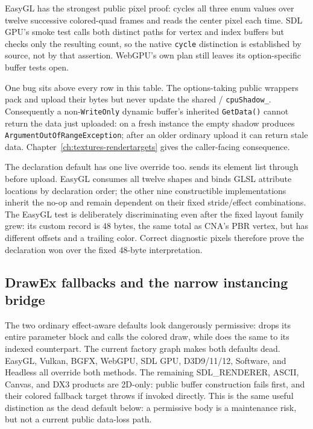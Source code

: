 EasyGL has the strongest public pixel proof:
 cycles all three enum values over twelve
successive colored-quad frames and reads the center pixel each time. SDL GPU's smoke test
calls both distinct paths for vertex and index buffers but checks only the resulting count,
so the native \texttt{cycle} distinction is established by source, not by that assertion.
WebGPU's own plan still leaves its option-specific buffer tests open.

One bug sits above every row in this table. The options-taking public wrappers pack and upload
their bytes but never update the shared /
\texttt{cpuShadow\_}. Consequently a non-\texttt{WriteOnly} dynamic buffer's inherited
\texttt{GetData()} cannot return the data just uploaded: on a fresh instance the empty shadow
produces \texttt{ArgumentOutOfRangeException}; after an older ordinary upload it can return
stale data. Chapter~\ref{ch:textures-rendertargets} gives the caller-facing consequence.

The declaration default has one live override too.  sends
its element list through  before upload. EasyGL consumes all
twelve  shapes and binds GLSL attribute locations by declaration
order; the other nine constructible implementations inherit the no-op and remain dependent on
their fixed stride/effect combinations. The EasyGL test is deliberately discriminating even
after the fixed layout family grew: its custom record is 48 bytes, the same total as CNA's PBR
vertex, but has different offsets and a trailing color. Correct diagnostic pixels therefore
prove the declaration won over the fixed 48-byte interpretation.

\subsection{DrawEx fallbacks and the narrow instancing bridge}
\label{sec:drawex-instancing-matrix}

The two ordinary effect-aware defaults look dangerously permissive:
 drops its entire parameter block and calls the colored draw, while
 does the same to its indexed counterpart. The current
factory graph makes both defaults dead. EasyGL, Vulkan, BGFX, WebGPU, SDL GPU, D3D9/11/12,
Software, and Headless all override both methods. The remaining SDL\_RENDERER, ASCII, Canvas,
and DX3 products are 2D-only: public buffer construction fails first, and their colored
fallback target throws if invoked directly. This is the same useful distinction as the dead
 default below: a
permissive body is a maintenance risk, but not a current public data-loss path.


